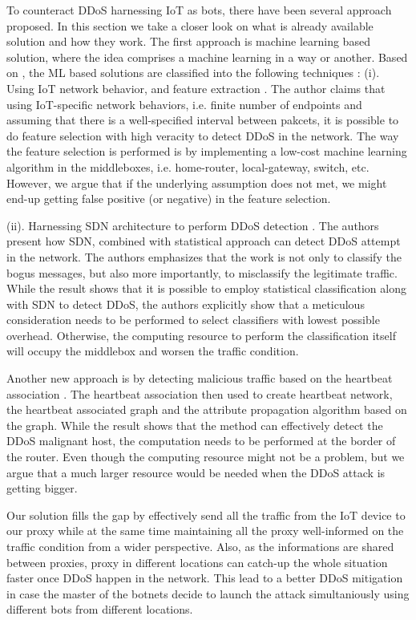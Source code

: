 \documentclass[sigplan,screen]{acmart}
\begin{document}
To counteract DDoS harnessing IoT as bots, there have been several approach proposed. In this section we take a closer look on what is already available solution and how they work. The first approach is machine learning based solution, where the idea comprises a machine learning in a way or another. Based on \cite{9020468}, the ML based solutions are classified into the following techniques : (i). Using IoT network behavior, and feature extraction \cite{8424629}. The author claims that using IoT-specific network behaviors, i.e. finite number of endpoints and assuming that there is a well-specified interval between pakcets, it is possible to do feature selection with high veracity to detect DDoS in the network. The way the feature selection is performed is by implementing a low-cost machine learning algorithm in the middleboxes, i.e. home-router, local-gateway, switch, etc. However, we argue that if the underlying assumption does not met, we might end-up getting false positive (or negative) in the feature selection.

(ii). Harnessing SDN architecture to perform DDoS detection \cite{8487445}. The authors present how SDN, combined with statistical approach can detect DDoS attempt in the network. The authors emphasizes that the work is not only to classify the bogus messages, but also more importantly, to misclassify the legitimate traffic. While the result shows that it is possible to employ statistical classification along with SDN to detect DDoS, the authors explicitly show that a meticulous consideration needs to be performed to select classifiers with lowest possible overhead. Otherwise, the computing resource to perform the classification itself will occupy the middlebox and worsen the traffic condition. 

Another new approach is by detecting malicious traffic based on the heartbeat association \cite{10.1145/3377644.3377653}. The heartbeat association then used to create heartbeat network, the heartbeat associated graph and the attribute propagation algorithm based on the graph. While the result shows that the method can effectively detect the DDoS malignant host, the computation needs to be performed at the border of the router. Even though the computing resource might not be a problem, but we argue that a much larger resource would be needed when the DDoS attack is getting bigger.

Our solution fills the gap by effectively send all the traffic from the IoT device to our proxy while at the same time maintaining all the proxy well-informed on the traffic condition from a wider perspective. Also, as the informations are shared between proxies, proxy in different locations can catch-up the whole situation faster once DDoS happen in the network. This lead to a better DDoS mitigation in case the master of the botnets decide to launch the attack simultaniously using different bots from different locations. 
\end{document}
